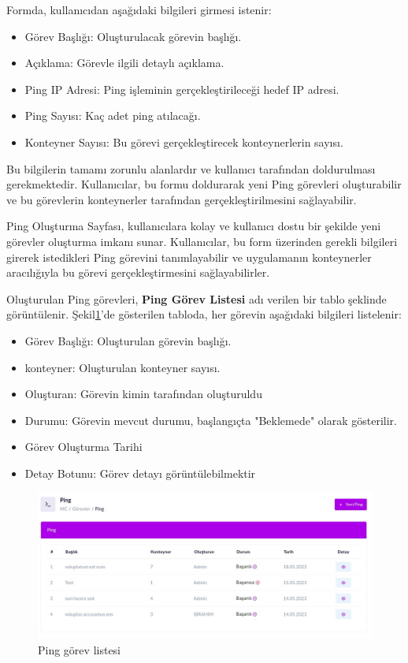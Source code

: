 Formda, kullanıcıdan aşağıdaki bilgileri girmesi istenir:
\begin{itemize}
	\item Görev Başlığı: Oluşturulacak görevin başlığı.
	\item Açıklama: Görevle ilgili detaylı açıklama.
	\item Ping IP Adresi: Ping işleminin gerçekleştirileceği hedef IP adresi.
	\item Ping Sayısı: Kaç adet ping atılacağı.
	\item Konteyner Sayısı: Bu görevi gerçekleştirecek konteynerlerin sayısı.
\end{itemize}

Bu bilgilerin tamamı zorunlu alanlardır ve kullanıcı tarafından doldurulması gerekmektedir. Kullanıcılar, bu formu doldurarak yeni Ping görevleri oluşturabilir ve bu görevlerin konteynerler tarafından gerçekleştirilmesini sağlayabilir.

Ping Oluşturma Sayfası, kullanıcılara kolay ve kullanıcı dostu bir şekilde yeni görevler oluşturma imkanı sunar. Kullanıcılar, bu form üzerinden gerekli bilgileri girerek istedikleri Ping görevini tanımlayabilir ve uygulamanın konteynerler aracılığıyla bu görevi gerçekleştirmesini sağlayabilirler.

Oluşturulan Ping görevleri, \textbf{Ping Görev Listesi} adı verilen bir tablo şeklinde görüntülenir. Şekil\ref{fig:ping_list}'de gösterilen tabloda, her görevin aşağıdaki bilgileri listelenir:

\begin{itemize}
	\item Görev Başlığı: Oluşturulan görevin başlığı.
	\item konteyner: Oluşturulan konteyner sayısı.
	\item Oluşturan: Görevin kimin tarafından oluşturuldu
	\item Durumu: Görevin mevcut durumu, başlangıçta "Beklemede" olarak gösterilir.
	\item Görev Oluşturma Tarihi
	\item Detay Botunu: Görev detayı görüntülebilmektir
\end{itemize}

\begin{figure}[ht]
	\centering
	\includegraphics[width=0.7\linewidth]{images/ping_list.jpeg}
	\caption{Ping görev listesi}
	\label{fig:ping_list}
\end{figure}

